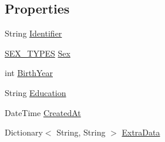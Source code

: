 \subsection*{Properties}
\begin{DoxyCompactItemize}
\item 
String \hyperlink{class_web_analyzer_1_1_models_1_1_base_1_1_experiment_participant_ac46dd512ce1496fa07e4304d5293fd13}{Identifier}
\item 
\hyperlink{class_web_analyzer_1_1_models_1_1_base_1_1_experiment_participant_a38a0a0bc1d3ad083204da1de1fb93754}{S\+E\+X\+\_\+\+T\+Y\+P\+E\+S} \hyperlink{class_web_analyzer_1_1_models_1_1_base_1_1_experiment_participant_af836bfc33d73671eec06864ce395b9a2}{Sex}
\item 
int \hyperlink{class_web_analyzer_1_1_models_1_1_base_1_1_experiment_participant_a0f2caf65917325b6ff1422a0e12408a1}{Birth\+Year}
\item 
String \hyperlink{class_web_analyzer_1_1_models_1_1_base_1_1_experiment_participant_aeed3afa47a4a966a0d5c3277348c2846}{Education}
\item 
Date\+Time \hyperlink{class_web_analyzer_1_1_models_1_1_base_1_1_experiment_participant_a9149e7b45b96c79f529042c1b208d086}{Created\+At}
\item 
Dictionary$<$ String, String $>$ \hyperlink{class_web_analyzer_1_1_models_1_1_base_1_1_experiment_participant_a64873ae3257de2a7a03333356dfee9ee}{Extra\+Data}
\end{DoxyCompactItemize}
